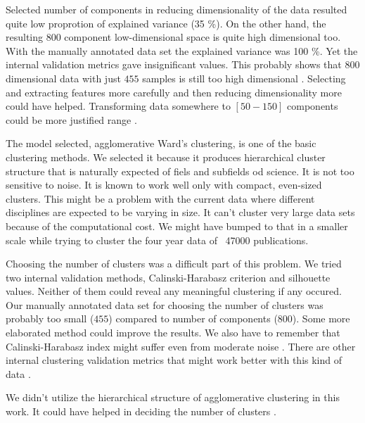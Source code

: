 Selected number of components in reducing dimensionality of the 
data resulted quite low proprotion of explained variance (35 \%).
On the other hand, the resulting $800$ component low-dimensional
space is quite high dimensional too.
With the manually annotated data set the explained variance was 
100 \%. Yet the internal validation metrics gave insignificant 
values. This probably shows that $800$ dimensional data with just 
$455$ samples is still too high dimensional \cite{aggarwal_surprising_2001}. 
Selecting and extracting features more carefully and then reducing
dimensionality more could have helped.
Transforming data somewhere to $[50-150]$ components could be more
justified range \cite{dolnicar_review_2002}. 

The model selected, agglomerative Ward's clustering, is one of the
basic clustering methods. We selected it because it produces 
hierarchical cluster structure that is naturally expected of fiels
and subfields od science. It is not too sensitive to noise.
It is known to work well only with compact, even-sized clusters.
This might be a problem with the current data where different 
disciplines are expected to be varying in size.
It can't cluster very large data sets because of the computational
cost. We might have bumped to that in a smaller scale while trying 
to cluster the four year data of ~47000 publications.

Choosing the number of clusters was a difficult part of this 
problem. We tried two internal validation methods,
Calinski-Harabasz criterion and silhouette values. Neither of them
could reveal any meaningful clustering if any occured.
Our manually annotated data set for choosing the number of clusters
was probably too small ($455$) compared to number of components 
($800$). Some more elaborated method could improve the results. 
We also have to remember that Calinski-Harabasz index might suffer
even from moderate noise \cite{liu_understanding_2010}.
There are other internal clustering validation metrics that might 
work better with this kind of data \cite{liu_understanding_2010}.

We didn't utilize the hierarchical structure of agglomerative 
clustering in this work. 
It could have helped in deciding the number of clusters \cite{kimes_statistical_2017}.


